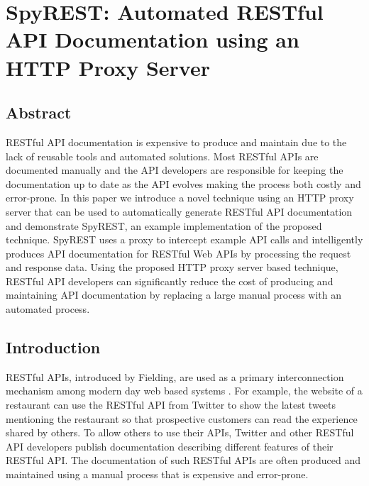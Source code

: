 \chapter{SpyREST: Automated RESTful API Documentation using an HTTP Proxy Server}
\label{chapter:spy_rest}




\section{Abstract}
RESTful API documentation is expensive to produce and maintain due to the lack of reusable tools and automated solutions. Most RESTful APIs are documented manually and the API developers are responsible for keeping the documentation up to date as the API evolves making the process both costly and error-prone. In this paper we introduce a novel technique using an HTTP proxy server that can be used to automatically generate RESTful API documentation and demonstrate SpyREST, an example implementation of the proposed technique. SpyREST uses a proxy to intercept example API calls and intelligently produces API documentation for RESTful Web APIs by processing the request and response data. Using the proposed HTTP proxy server based technique, RESTful API developers can significantly reduce the cost of producing and maintaining API documentation by replacing a large manual process with an automated process.




\section{Introduction}
RESTful APIs, introduced by Fielding, are used as a primary interconnection mechanism among modern day web based systems \cite{Fielding_rest}. For example, the website of a restaurant can use the RESTful API from Twitter to show the latest tweets mentioning the restaurant so that prospective customers can read the experience shared by others. To allow others to use their APIs, Twitter and other RESTful API developers publish documentation describing different features of their RESTful API. The documentation of such RESTful APIs are often produced and maintained using a manual process that is expensive and error-prone.

